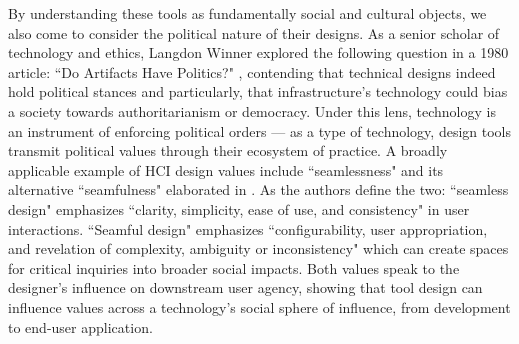 By understanding these tools as fundamentally social and cultural objects, we also come to consider the political nature of their designs. As a senior scholar of technology and ethics, Langdon Winner explored the following question in a 1980 article: ``Do Artifacts Have Politics?" \cite{winner_artifacts_1980}, contending that technical designs indeed hold political stances and particularly, that infrastructure's technology could bias a society towards authoritarianism or democracy. Under this lens, technology is an instrument of enforcing political orders --- as a type of technology, design tools transmit political values through their ecosystem of practice. A broadly applicable example of HCI design values include ``seamlessness" and its alternative ``seamfulness" elaborated in \cite{inman_beautiful_2019}. As the authors define the two: ``seamless design" emphasizes ``clarity, simplicity, ease of use, and consistency" in user interactions. ``Seamful design" emphasizes ``configurability, user appropriation, and revelation of complexity, ambiguity or inconsistency" which can create spaces for critical inquiries into broader social impacts. Both values speak to the designer's influence on downstream user agency, showing that tool design can influence values across a technology's social sphere of influence, from development to end-user application. 


